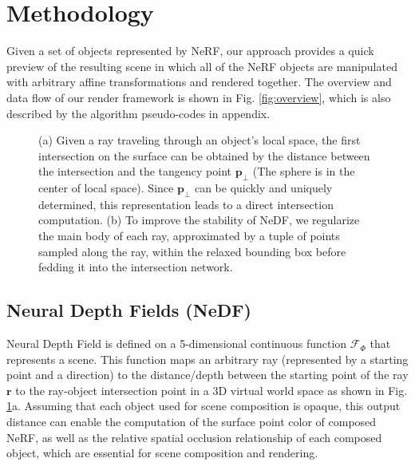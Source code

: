 \documentclass[letterpaper]{article}
\begin{document}
\section{Methodology}

Given a set of objects represented by NeRF, our approach provides a quick preview of the resulting scene in which all of the NeRF objects are manipulated with arbitrary affine transformations and rendered together. The overview and data flow of our render framework is shown in Fig. \ref{fig:overview}, which is also described by the  algorithm pseudo-codes in appendix.

\begin{figure}[tbp]
  \centering
  \caption{(a) Given a ray traveling through an object's local space, the first intersection on the surface can be obtained by the distance between the intersection and the tangency point $\mathbf{p}_{\perp}$ (The sphere is in the center of local space).
  Since $\mathbf{p}_{\perp}$ can be quickly and uniquely determined, this representation leads to a direct intersection computation. (b) To improve the stability of NeDF, we regularize the main body of each ray, approximated by a tuple of points sampled along the ray, within the relaxed bounding box
  before fedding it into the intersection network.
  }
  \label{fig:rep_ray}
\end{figure}

\subsection{Neural Depth Fields (NeDF)}
 Neural Depth Field is defined on a 5-dimensional continuous function $\mathcal{F}_{\Phi}$ that represents a scene. This function maps an arbitrary ray (represented by a starting point and a direction) to the distance/depth between the starting point of the ray $\mathbf{r}$ to the ray-object intersection point in a 3D virtual world space as shown in Fig. \ref{fig:rep_ray}a. Assuming that each object used for scene composition is opaque, this output distance can enable the computation of the surface point color of composed NeRF, as well as the relative spatial occlusion relationship of each composed object, which are essential for scene composition and rendering.
\end{document}
